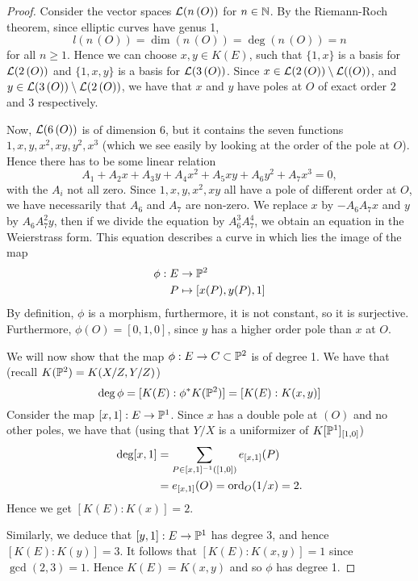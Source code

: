 \begin{proof}
	Consider the vector spaces $\mathcal{L}(n\,(O))$ for $n \in \mathbb{N}$.
	By the Riemann-Roch theorem, since elliptic curves have genus 1,
	\begin{equation*}
		l(n\,(O)) = \dim(n\,(O)) = \deg(n\,(O)) = n
	\end{equation*}
	for all $n \geq 1$. Hence we can choose $x, y \in K(E)$, such that
	$\{1, x\}$ is a basis for $\mathcal{L}(2\,(O))$ and $\{1, x, y\}$
	is a basis for $\mathcal{L}(3\,(O))$.
	Since $x \in \mathcal{L}(2\,(O))\setminus\mathcal{L}((O))$, 
	and $y \in \mathcal{L}(3\,(O))\setminus\mathcal{L}(2\,(O))$, we have that
	$x$ and $y$ have poles at $O$ of exact order $2$ and $3$
	respectively.
	
	Now, $\mathcal{L}(6\,(O))$ is of dimension $6$, but it contains the seven
	functions $1, x, y, x^2, xy, y^2, x^3$ (which we see easily by
	looking at the order of the pole at $O$). Hence there has to be some
	linear relation
	\begin{equation*}
		A_1 + A_2x + A_3y + A_4x^2 + A_5xy + A_6y^2 + A_7x^3 = 0,
	\end{equation*}
	with the $A_i$ not all zero.
	Since $1, x, y, x^2, xy$ all have a pole of different order at $O$,
	we have necessarily that $A_6$ and $A_7$ are non-zero.
	We replace $x$ by $-A_6A_7x$ and $y$ by $A_6A_7^2y$, then if we divide 
	the equation by $A_6^3A_7^4$, we obtain an equation in the Weierstrass
	form. This equation describes a curve in which lies the image of the map
	\begin{align*}
		\phi:E &\to \mathbb{P}^2\\
		P &\mapsto [x(P), y(P), 1]
	\end{align*}
	By definition, $\phi$ is a morphism, furthermore, it is not constant,
	so it is surjective. Furthermore, $\phi(O) = [0, 1, 0]$, since
	$y$ has a higher order pole than $x$ at $O$.

	We will now show that the map $\phi: E\to C\subset \mathbb{P}^2$ is of degree 1.
	We have that (recall $K(\mathbb{P}^2) = K(X/Z, Y/Z)$)
	\begin{equation*}
		\deg\phi = [K(E): \phi^*K(\mathbb{P}^2)] = [K(E): K(x, y)]
	\end{equation*}
	Consider the map $[x, 1]: E \to \mathbb{P}^1$. Since $x$ has a double pole
	at $(O)$ and no other poles, we have that (using that
	$Y/X$ is a uniformizer of $K[\mathbb{P}^1]_{[1, 0]}$)
	\begin{align*}
		\deg[x, 1] &= \sum_{P \in [x, 1]^{-1}([1, 0])}
		e_{[x, 1]}(P)\\
		&= e_{[x, 1]}(O)
		= \operatorname{ord}_O(1/x) = 2.
	\end{align*}
	Hence we get $[K(E): K(x)] = 2$.
	
	Similarly,
	we deduce that $[y, 1]: E \to \mathbb{P}^1$ 
	has degree 3, and hence $[K(E): K(y)] = 3$.
	It follows that $[K(E): K(x, y)] = 1$ since $\gcd(2, 3) = 1$.
	Hence $K(E) = K(x, y)$ and so $\phi$ has degree 1.

\end{proof}

